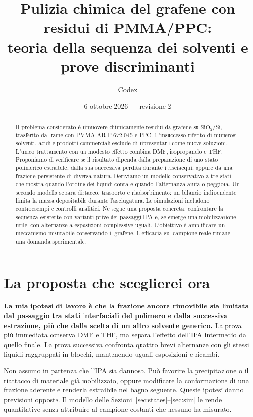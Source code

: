 \documentclass[11pt,reqno]{amsart}
\title[Grafene: teoria della pulizia a solventi sequenziali]{Pulizia chimica del grafene con residui di PMMA/PPC:\\ teoria della sequenza dei solventi e prove discriminanti}
\author{Codex}
\date{6 ottobre 2026 --- revisione 2}
\numberwithin{equation}{section}
\newcommand{\SiO}{\ensuremath{\mathrm{SiO}_2}}
\begin{document}
\begin{abstract}
Il problema considerato \`e rimuovere chimicamente residui da grafene
su \SiO/Si, trasferito dal rame con PMMA AR-P 672.045 e PPC.
L'insuccesso riferito di numerosi solventi, acidi e prodotti commerciali
esclude di ripresentarli come nuove soluzioni. L'unico trattamento con
un modesto effetto combina DMF, isopropanolo e THF. Proponiamo di
verificare se il risultato dipenda dalla preparazione di uno stato
polimerico estraibile, dalla sua successiva perdita durante i
risciacqui, oppure da una frazione persistente di diversa natura.
Deriviamo un modello conservativo a tre stati che mostra quando
l'ordine dei liquidi conta e quando l'alternanza aiuta o peggiora.
Un secondo modello separa distacco, trasporto e riadsorbimento;
un bilancio indipendente limita la massa depositabile durante
l'asciugatura. Le simulazioni includono controesempi e controlli
analitici. Ne segue una proposta concreta: confrontare la sequenza
esistente con varianti prive dei passaggi IPA e, se emerge una
mobilizzazione utile, con alternanze a esposizioni complessive uguali.
L'obiettivo \`e amplificare un meccanismo misurabile conservando il
grafene. L'efficacia sul campione reale rimane una domanda sperimentale.
\end{abstract}
\maketitle

\section{La proposta che sceglierei ora}

\textbf{La mia ipotesi di lavoro \`e che la frazione ancora rimovibile
sia limitata dal passaggio tra stati interfaciali del polimero e dalla
successiva estrazione, pi\`u che dalla scelta di un altro solvente
generico.} La prova pi\`u immediata conserva DMF e THF, ma separa
l'effetto dell'IPA intermedio da quello finale. La prova successiva
confronta quattro brevi alternanze con gli stessi liquidi raggruppati
in blocchi, mantenendo uguali esposizioni e ricambi.

Non assumo in partenza che l'IPA sia dannoso. Pu\`o favorire la
precipitazione o il riattacco di materiale gi\`a mobilizzato, oppure
modificare la conformazione di una frazione aderente e renderla
estraibile nel bagno seguente. Queste ipotesi danno previsioni
opposte. Il modello delle Sezioni~\ref{sec:states}--\ref{sec:sim}
le rende quantitative senza attribuire al campione costanti che
nessuno ha misurato.
\end{document}
